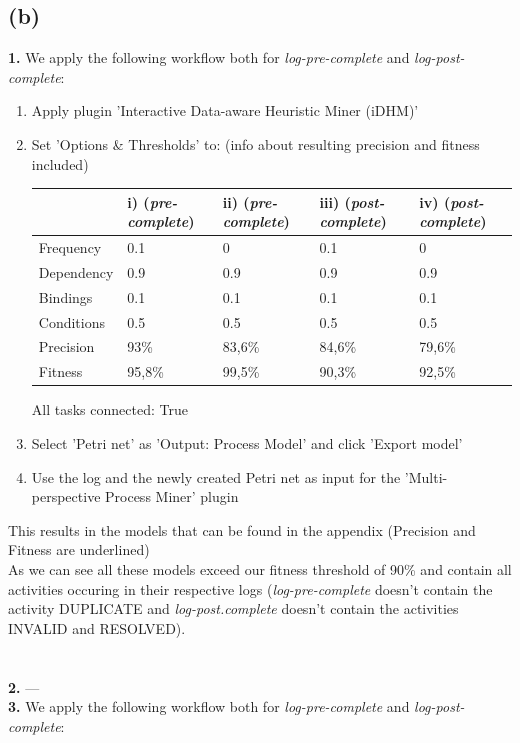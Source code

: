 \documentclass[../../main.tex]{subfiles}
\begin{document}
\subsection*{(b)}
\textbf{1.} We apply the following workflow both for \textit{log-pre-complete} and \textit{log-post-complete}:
\begin{enumerate}
\item Apply plugin 'Interactive Data-aware Heuristic Miner (iDHM)'
\item Set 'Options \& Thresholds' to: (info about resulting precision and fitness included)\\
\begin{table}[h!]
\begin{tabular}{l|llll}
           & i) (\textit{pre-complete}) & ii) (\textit{pre-complete}) & iii) (\textit{post-complete}) & iv) (\textit{post-complete})\\
           \hline
Frequency  & 0.1 & 0   & 0.1  & 0   \\
Dependency & 0.9 & 0.9 & 0.9  & 0.9 \\
Bindings   & 0.1 & 0.1 & 0.1  & 0.1 \\
Conditions & 0.5 & 0.5 & 0.5  & 0.5 \\
\hline
Precision & 93\%   & 83,6\% & 84,6\% & 79,6\% \\
Fitness   & 95,8\% & 99,5\% & 90,3\% & 92,5\% \\
\end{tabular}
\end{table}
All tasks connected: True
\item Select 'Petri net' as 'Output: Process Model' and click 'Export model'
\item Use the log and the newly created Petri net as input for the 'Multi-perspective Process Miner' plugin
\end{enumerate}
This results in the models that can be found in the appendix (Precision and Fitness are underlined)\\
As we can see all these models exceed our fitness threshold of 90\% and contain all activities occuring in their respective logs (\textit{log-pre-complete} doesn't contain the activity DUPLICATE and \textit{log-post.complete} doesn't contain the activities INVALID and RESOLVED).\\
\\ \ \\
\textbf{2.} ---\\
\textbf{3.} We apply the following workflow both for \textit{log-pre-complete} and \textit{log-post-complete}:
\end{document}
